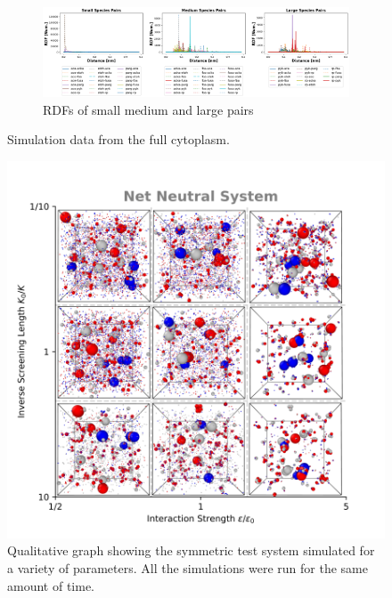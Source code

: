 \documentclass[draft, english]{volcanica-template}
\begin{document}
\begin{figure}[!htbp]
\begin{figure}[!htbp]
\centering
\includegraphics[width=0.7\linewidth]{files/Pairwise_RDFs_ij-ed8f44139460c5096ad9c492645351db.png}
\caption[]{RDFs of small medium and large pairs}
\label{Fig9_IntCytoSys-d}
\end{figure}
\caption[]{Simulation data from the full cytoplasm.}
\label{Fig9_IntCytoSys-d}
\end{figure}

\begin{figure}[!htbp]
\centering
\includegraphics[width=0.7\linewidth]{files/E-K-ParamScan_SymTes-6134ee909bb377abb0319427f0e44a9b.png}
\caption[]{Qualitative graph showing the symmetric test system simulated for a variety of parameters. All the simulations were run for the same amount of time.}
\label{Fig10_SymTestSys_ParamScan}
\end{figure}
\end{document}
